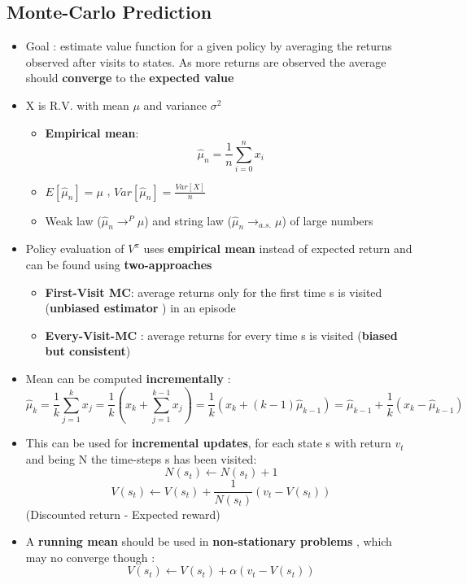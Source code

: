 \documentclass[12pt]{article} %
\begin{document}
\subsection{Monte-Carlo Prediction}
\begin{itemize}
\item Goal : estimate value function for a given policy  by averaging the returns observed after visits to states. As more returns are observed the average should \textbf{converge} to the \textbf{expected value}

\item X is R.V. with mean $\mu$ and variance $\sigma^2$
\begin{itemize}
\item \textbf{Empirical mean}:$$ \hat{\mu}_n = \frac{1}{n}\sum_{i=0}^n x_i$$	
\item $E[\hat{\mu}_n] = \mu $ , $Var[\hat{\mu}_n]= \frac{Var[X]}{n}$
\item Weak law ($\hat{\mu}_n \rightarrow^{P} \mu$) and string law ($\hat{\mu}_n \rightarrow_{a.s.} \mu $) of  large numbers
\end{itemize}

\item Policy evaluation of $V^{\pi}$ uses \textbf{empirical mean} instead of expected return and can be found using \textbf{two-approaches}
\begin{itemize}
\item \textbf{First-Visit MC}: average returns only for the first time s is visited (\textbf{unbiased estimator} ) in an episode
\item \textbf{Every-Visit-MC} : average returns for every time s is visited (\textbf{biased but consistent})
\end{itemize}

\item Mean can be computed \textbf{incrementally} : 
$$ \hat{\mu}_k = \frac{1}{k} \sum_{j=1}^k x_j = \frac{1}{k}\left( x_k + \sum_{j=1}^{k-1}x_j \right)= \frac{1}{k}(x_k+(k-1)\hat{\mu}_{k-1})=\hat{\mu}_{k-1}+\frac{1}{k}(x_k - \hat{\mu}_{k-1})$$

\item This can be used for \textbf{incremental updates}, for each state s with return $v_t$ and being N the time-steps s has been visited:
$$ N(s_t) \leftarrow N(s_t)+1$$
$$ V(s_t) \leftarrow V(s_t)+ \frac{1}{N(s_t)}(v_t-V(s_t))$$
(Discounted return - Expected reward)

\item A \textbf{running mean} should be used in \textbf{non-stationary problems} , which may no converge though : 
$$ V(s_t) \leftarrow V(s_t) + \alpha(v_t - V(s_t))$$
\end{itemize}
\end{document}
